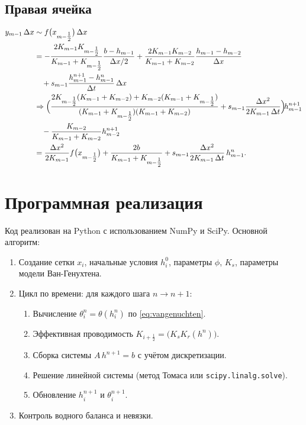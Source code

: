 \documentclass[a4paper,12pt]{article}
\begin{document}
\subsection{Правая ячейка}
\begin{align}
y_{m-1}\,\Delta x
&\sim f\bigl(x_{m-\tfrac12}\bigr)\,\Delta x
\nonumber\\
&=
- \frac{2K_{m-1}K_{m-\tfrac12}}{K_{m-1}+K_{m-\tfrac12}}
\frac{b-h_{m-1}}{\Delta x/2}
+ \frac{2K_{m-1}K_{m-2}}{K_{m-1}+K_{m-2}}
\frac{h_{m-1}-h_{m-2}}{\Delta x}
\nonumber\\
&\quad+ s_{m-1}\frac{h_{m-1}^{n+1}-h_{m-1}^n}{\Delta t}\,\Delta x
\nonumber\\
&\Rightarrow
\Bigl(
\frac{2K_{m-\tfrac12}(K_{m-1}+K_{m-2})+K_{m-2}(K_{m-1}+K_{m-\tfrac12})}
{(K_{m-1}+K_{m-\tfrac12})(K_{m-1}+K_{m-2})}
+ s_{m-1}\frac{\Delta x^2}{2K_{m-1}\,\Delta t}
\Bigr)\!h_{m-1}^{n+1}
\nonumber\\
&\quad
- \frac{K_{m-2}}{K_{m-1}+K_{m-2}}h_{m-2}^{n+1}
\nonumber\\
&= \frac{\Delta x^2}{2K_{m-1}}f\bigl(x_{m-\tfrac12}\bigr)
+ \frac{2b}{K_{m-1}+K_{m-\tfrac12}}
+ s_{m-1}\frac{\Delta x^2}{2K_{m-1}\,\Delta t}\,h_{m-1}^n.
\end{align}

\section{Программная реализация}
Код реализован на Python с использованием NumPy и SciPy. Основной алгоритм:
\begin{enumerate}
  \item Создание сетки $x_i$, начальные условия $h_i^0$, параметры $\phi$, $K_s$, параметры модели Ван-Генухтена.
  \item Цикл по времени: для каждого шага $n\to n+1$:
    \begin{enumerate}
      \item Вычисление $\theta_i^n=\theta(h_i^n)$ по \eqref{eq:vangenuchten}.
      \item Эффективная проводимость $K_{i+\frac12} = \bigl(K_sK_r(h^n)\bigr)$.
      \item Сборка системы $A\,h^{n+1}=b$ с учётом дискретизации.
      \item Решение линейной системы (метод Томаса или \texttt{scipy.linalg.solve}).
      \item Обновление $h_i^{n+1}$ и $\theta_i^{n+1}$.
    \end{enumerate}
  \item Контроль водного баланса и невязки.
\end{enumerate}
\end{document}
